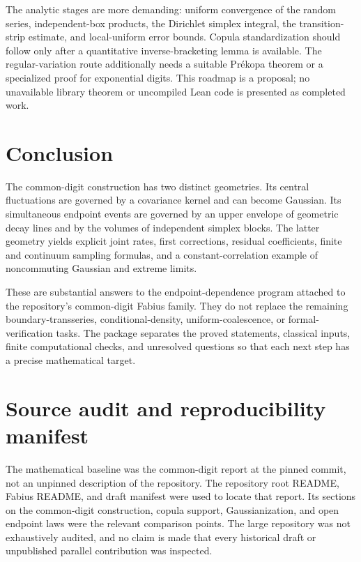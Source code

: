 \documentclass[11pt,a4paper]{article}
\theoremstyle{definition}
\theoremstyle{remark}
\numberwithin{equation}{section}
\begin{document}
The analytic stages are more demanding: uniform convergence of the random
series, independent-box products, the Dirichlet simplex integral, the
transition-strip estimate, and local-uniform error bounds. Copula
standardization should follow only after a quantitative inverse-bracketing
lemma is available. The regular-variation route additionally needs a
suitable Pr\'ekopa theorem or a specialized proof for exponential digits.
This roadmap is a proposal; no unavailable library theorem or uncompiled
Lean code is presented as completed work.

\section{Conclusion}
The common-digit construction has two distinct geometries. Its central
fluctuations are governed by a covariance kernel and can become Gaussian.
Its simultaneous endpoint events are governed by an upper envelope of
geometric decay lines and by the volumes of independent simplex blocks.
The latter geometry yields explicit joint rates, first corrections,
residual coefficients, finite and continuum sampling formulas, and a
constant-correlation example of noncommuting Gaussian and extreme limits.

These are substantial answers to the endpoint-dependence program attached
to the repository's common-digit Fabius family. They do not replace the
remaining boundary-transseries, conditional-density, uniform-coalescence,
or formal-verification tasks. The package separates the proved statements,
classical inputs, finite computational checks, and unresolved questions so
that each next step has a precise mathematical target.

\appendix
\section{Source audit and reproducibility manifest}
\label{app:audit}

The mathematical baseline was the common-digit report at the pinned commit,
not an unpinned description of the repository. The repository root README,
Fabius README, and draft manifest were used to locate that report. Its
sections on the common-digit construction, copula support, Gaussianization,
and open endpoint laws were the relevant comparison points. The large
repository was not exhaustively audited, and no claim is made that every
historical draft or unpublished parallel contribution was inspected.
\end{document}
